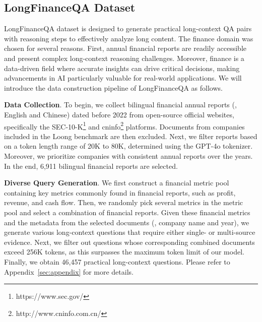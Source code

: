 

\subsection{LongFinanceQA Dataset} \label{sec:3.2}\vspace{-1mm}
LongFinanceQA dataset is designed to generate practical long-context QA pairs with reasoning steps to effectively analyze long content. The finance domain was chosen for several reasons. First, annual financial reports are readily accessible and present complex long-context reasoning challenges. Moreover, finance is a data-driven field where accurate insights can drive critical decisions, making advancements in AI particularly valuable for real-world applications. We will introduce the data construction pipeline of LongFinanceQA as follows.

\noindent \textbf{Data Collection}. To begin, we collect bilingual financial annual reports (\ie, English and Chinese) dated before 2022 from open-source official websites, specifically the {SEC-10-K}\footnote{https://www.sec.gov/} and {cninfo}\footnote{http://www.cninfo.com.cn/} platforms. Documents from companies included in the Loong benchmark are then excluded. Next, we filter reports based on a token length range of 20K to 80K, determined using the GPT-4o tokenizer. Moreover, we prioritize companies with consistent annual reports over the years. In the end, 6,911 bilingual financial reports are selected.

\noindent \textbf{Diverse Query Generation}.
We first construct a financial metric pool containing key metrics commonly found in financial reports, such as profit, revenue, and cash flow. Then, we randomly pick several metrics in the metric pool and select a combination of financial reports. Given these financial metrics and the metadata from the selected documents (\eg, company name and year), we generate various long-context questions that require either single- or multi-source evidence. 
Next, we filter out questions whose corresponding combined documents exceed 256K tokens, as this surpasses the maximum token limit of our model. Finally, we obtain 46,457 practical long-context questions.
Please refer to Appendix~\ref{sec:appendix} for more details.

